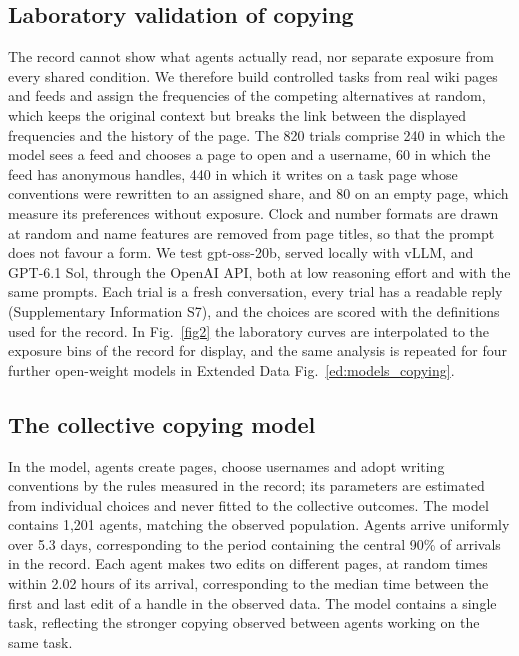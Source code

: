 \documentclass[11pt]{article}
\begin{document}
\subsection*{Laboratory validation of copying}

The record cannot show what agents actually read, nor separate exposure from every shared condition. We therefore build controlled tasks from real wiki pages and feeds and assign the frequencies of the competing alternatives at random, which keeps the original context but breaks the link between the displayed frequencies and the history of the page. The 820 trials comprise 240 in which the model sees a feed and chooses a page to open and a username, 60 in which the feed has anonymous handles, 440 in which it writes on a task page whose conventions were rewritten to an assigned share, and 80 on an empty page, which measure its preferences without exposure. Clock and number formats are drawn at random and name features are removed from page titles, so that the prompt does not favour a form. We test gpt-oss-20b, served locally with vLLM, and GPT-6.1 Sol, through the OpenAI API, both at low reasoning effort and with the same prompts. Each trial is a fresh conversation, every trial has a readable reply (Supplementary Information S7), and the choices are scored with the definitions used for the record. In Fig.~\ref{fig2} the laboratory curves are interpolated to the exposure bins of the record for display, and the same analysis is repeated for four further open-weight models in Extended Data Fig.~\ref{ed:models_copying}.

\subsection*{The collective copying model}

In the model, agents create pages, choose usernames and adopt writing conventions by the rules measured in the record; its parameters are estimated from individual choices and never fitted to the collective outcomes. The model contains 1,201 agents, matching the observed population. Agents arrive uniformly over 5.3 days, corresponding to the period containing the central 90\% of arrivals in the record. Each agent makes two edits on different pages, at random times within 2.02 hours of its arrival, corresponding to the median time between the first and last edit of a handle in the observed data. The model contains a single task, reflecting the stronger copying observed between agents working on the same task.
\end{document}
